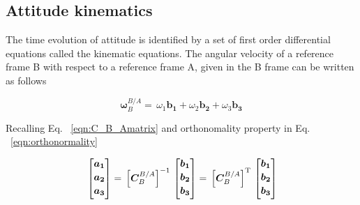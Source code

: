 

\subsection{Attitude kinematics}

The time evolution of attitude is identified by a set of first order differential equations called the kinematic equations. 
The angular velocity of a reference frame B with respect to a reference frame A, given in the B frame can be written as follows

\begin{equation}\label{eqn:quaternion1}
\bm{\omega}_B^{B/A}
 =\,
\omega_1 \bm{b_1} + \omega_2 \bm{b_2} + \omega_3 \bm{b_3}
\end{equation}

Recalling Eq. ~\ref{eqn:C_B_Amatrix} and orthonomality property in Eq. ~\ref{eqn:orthonormality}

\begin{equation}{\label{eqn:kinematicsDerivation1}}
\begin{bmatrix}
\bm{a_1}\\[0.2em]
\bm{a_2}\\[0.2em]
\bm{a_3}\\[0.2em]
\end{bmatrix}
=\,
\Big[{\bm{C}_B^{B/A}}\Big]^{-1}
\,
\begin{bmatrix}
\bm{b_1}\\[0.2em]
\bm{b_2}\\[0.2em]
\bm{b_3}\\[0.2em]
\end{bmatrix}
=\,
\Big[{\bm{C}_B^{B/A}}\Big]^{\rm T}
\,
\begin{bmatrix}
\bm{b_1}\\[0.2em]
\bm{b_2}\\[0.2em]
\bm{b_3}\\[0.2em]
\end{bmatrix}
\end{equation} 

